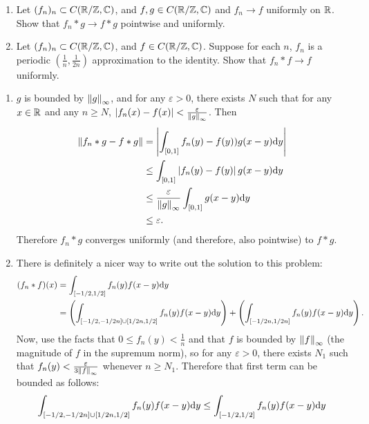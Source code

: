 \documentclass{article}
\begin{document}
\bigskip
\begin{prob}
    \begin{enumerate}[label=(\alph*)]
        \item Let $(f_n)_n \subset C(\mathbb{R}/\mathbb{Z}, \mathbb{C})$, and $f,g \in C(\mathbb{R}/\mathbb{Z},\mathbb{C})$ and $f_n \rightarrow f$ uniformly on $\mathbb{R}$. Show that $f_n * g \rightarrow f*g$ pointwise and uniformly.
        \item Let $(f_n)_n \subset C(\mathbb{R}/\mathbb{Z}, \mathbb{C})$, and $f \in C(\mathbb{R}/\mathbb{Z},\mathbb{C})$. Suppose for each $n$, $f_n$ is a periodic $ \left( \frac{1}{n}, \frac{1}{2n} \right) $ approximation to the identity. Show that $f_n * f \rightarrow f$ uniformly.
    \end{enumerate}
\end{prob}
\begin{enumerate}[label=(\alph*)]
    \item $g$ is bounded by $\left\lVert g\right\rVert_\infty$, and for any $\varepsilon > 0$, there exists $N$ such that for any $x \in \mathbb{R}$ and any $n \geq N$, $\left\lvert f_n(x)-f(x) \right\rvert < \frac{\varepsilon}{\left\lVert g\right\rVert_\infty}$. Then \begin{align*}
            \left\lVert f_n*g-f*g\right\rVert &= \left\lvert \int_{[0,1]} f_n(y)-f(y))g(x-y) \mathrm{d} y \right\rvert \\
                             &\leq \int_{[0,1]} \left\lvert f_n(y)-f(y) \right\rvert g(x-y) \mathrm{d} y \\
                             &\leq \frac{\varepsilon}{\left\lVert g\right\rVert_\infty} \int_{[0,1]} g(x-y) \mathrm{d} y \\
                             &\leq \varepsilon.
    \end{align*}
    Therefore $f_n*g$ converges uniformly (and therefore, also pointwise) to $f*g$.
    \item There is definitely a nicer way to write out the solution to this problem: \begin{align*}
            (f_n*f)(x) &= \int_{[-1/2,1/2]} f_n(y)f(x-y) \mathrm{d} y \\
                       &= \left( \int_{[-1/2,-1/2n]\cup[1/2n,1/2]} f_n(y)f(x-y) \mathrm{d} y \right) + \left( \int_{[-1/2n,1/2n]} f_n(y)f(x-y) \mathrm{d} y \right).
    \end{align*}
    Now, use the facts that $0 \leq f_n(y) < \frac{1}{n}$ and that $f$ is bounded by $\left\lVert f\right\rVert_\infty$ (the magnitude of $f$ in the supremum norm), so for any $\varepsilon > 0$, there exists $N_1$ such that $f_n(y) < \frac{\varepsilon}{3 \left\lVert f\right\rVert_\infty}$ whenever $n \geq N_1$. Therefore that first term can be bounded as follows:
    \begin{align*}
        \int_{[-1/2,-1/2n]\cup[1/2n,1/2]} f_n(y)f(x-y) \d y &\leq \int_{[-1/2,1/2]} f_n(y) f(x-y) \d y \\

\end{align*}
\end{enumerate}
\end{document}

